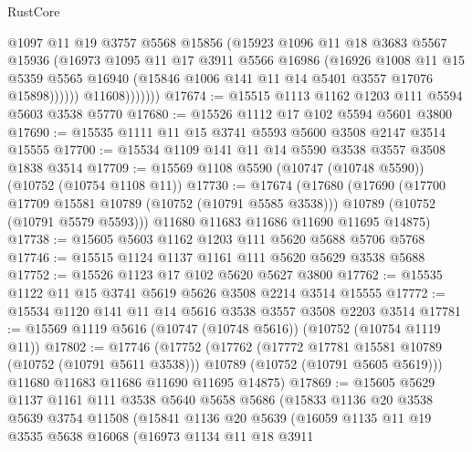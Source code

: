 \begin{lexlean}{RustCore}
\begin{coremodule}
                      @1097
                      @11
                      @19
                      @3757
                      @5568
                      @15856
                      (@15923
                        @1096
                        @11
                        @18
                        @3683
                        @5567
                        @15936
                        (@16973
                          @1095
                          @11
                          @17
                          @3911
                          @5566
                          @16986
                          (@16926
                            @1008
                            @11
                            @15
                            @5359
                            @5565
                            @16940
                            (@15846 @1006 @141 @11 @14 @5401 @3557 @17076 @15898))))))
                  @11608)))))))
@17674 := @15515 @1113 @1162 @1203 @111 @5594 @5603 @3538 @5770
@17680 := @15526 @1112 @17 @102 @5594 @5601 @3800
@17690 := @15535 @1111 @11 @15 @3741 @5593 @5600 @3508 @2147 @3514 @15555
@17700 := @15534 @1109 @141 @11 @14 @5590 @3538 @3557 @3508 @1838 @3514
@17709 := @15569 @1108 @5590 (@10747 (@10748 @5590)) (@10752 (@10754 @1108 @11))
@17730 := @17674
    (@17680
      (@17690
        (@17700 @17709 @15581 @10789 (@10752 (@10791 @5585 @3538)))
        @10789
        (@10752 (@10791 @5579 @5593)))
      @11680
      @11683
      @11686
      @11690
      @11695
      @14875)
@17738 := @15605 @5603 @1162 @1203 @111 @5620 @5688 @5706 @5768
@17746 := @15515 @1124 @1137 @1161 @111 @5620 @5629 @3538 @5688
@17752 := @15526 @1123 @17 @102 @5620 @5627 @3800
@17762 := @15535 @1122 @11 @15 @3741 @5619 @5626 @3508 @2214 @3514 @15555
@17772 := @15534 @1120 @141 @11 @14 @5616 @3538 @3557 @3508 @2203 @3514
@17781 := @15569 @1119 @5616 (@10747 (@10748 @5616)) (@10752 (@10754 @1119 @11))
@17802 := @17746
    (@17752
      (@17762
        (@17772 @17781 @15581 @10789 (@10752 (@10791 @5611 @3538)))
        @10789
        (@10752 (@10791 @5605 @5619)))
      @11680
      @11683
      @11686
      @11690
      @11695
      @14875)
@17869 := @15605
    @5629
    @1137
    @1161
    @111
    @3538
    @5640
    @5658
    @5686
    (@15833
      @1136
      @20
      @3538
      @5639
      @3754
      @11508
      (@15841
        @1136
        @20
        @5639
        (@16059
          @1135
          @11
          @19
          @3535
          @5638
          @16068
          (@16973
            @1134
            @11
            @18
            @3911

\end{coremodule}
\end{lexlean}
